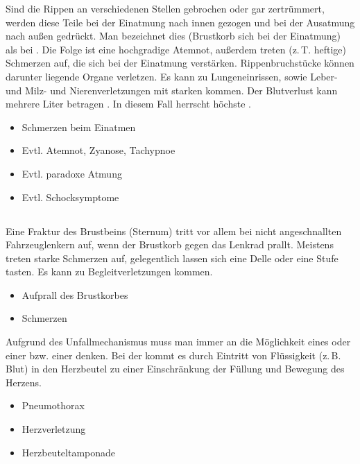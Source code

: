 \TextSlide{{\TxSymptome}}
{%
Sind die Rippen an verschiedenen Stellen gebrochen 
oder gar zertrümmert, 
werden diese Teile bei der Einatmung nach innen gezogen 
und bei der Ausatmung nach außen gedrückt. 
%
Man bezeichnet dies 
(Brustkorb  sich bei der Einatmung)
als  
bei . 
%
Die Folge ist eine hochgradige Atemnot, 
außerdem treten (z.\,T. heftige) Schmerzen auf, 
die sich bei der Einatmung verstärken. 
%
Rippenbruchstücke können darunter liegende Organe verletzen. 
Es kann zu Lungeneinrissen, 
sowie Leber- und Milz- und Nierenverletzungen 
mit starken  kommen. 
%
Der Blutverlust kann mehrere Liter betragen \cite{LPN3}. 
%
In diesem Fall herrscht höchste .
}{
\begin{itemize}
  \item Schmerzen beim Einatmen
  \item Evtl. Atemnot, Zyanose, Tachypnoe
  \item Evtl. paradoxe Atmung
  \item Evtl. Schocksymptome
\end{itemize}
}{}{}{}

\TextSlide{\TxGefahren}
{%

}
{%

}

\subsection{}
\label{topic:sternumfraktur}

\TextSlide{\TxBeschreibung}
{%
%
Eine Fraktur des Brustbeins (Sternum) tritt vor allem bei
nicht angeschnallten Fahrzeuglenkern auf, wenn der Brustkorb
gegen das Lenkrad prallt. Meistens treten starke Schmerzen
auf, gelegentlich lassen sich eine Delle oder eine Stufe
tasten. \cite{LPN3} Es kann zu Begleitverletzungen kommen.
}
{%
\begin{itemize}
  \item Aufprall des Brustkorbes
  \item Schmerzen
\end{itemize}
}

\TextSlide{\TxGefahren}
{%
Aufgrund des Unfallmechanismus muss man immer an die Möglichkeit eines
 oder einer  bzw. einer  denken.
Bei der  kommt es durch Eintritt von Flüssigkeit (z.\,B. Blut) in den Herzbeutel zu einer Einschränkung der Füllung und Bewegung des Herzens.
}
{%
\begin{itemize}
  \item Pneumothorax
  \item Herzverletzung 
  \item Herzbeuteltamponade
\end{itemize}
}

